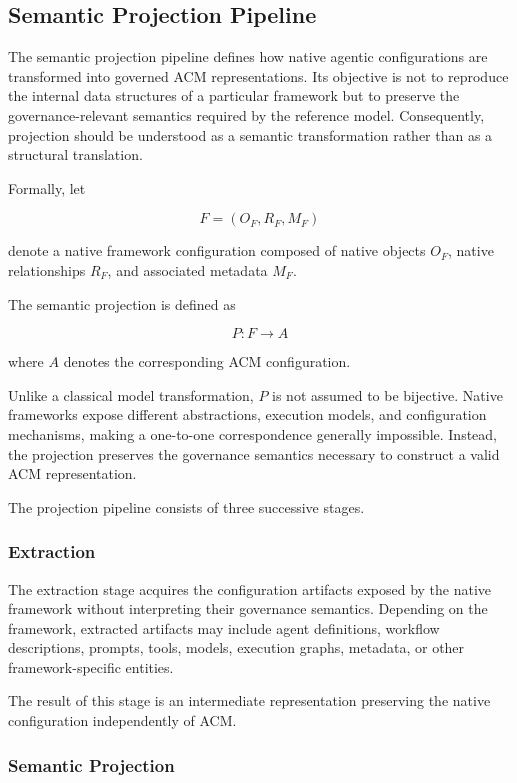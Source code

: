 \documentclass[10pt]{article}
\begin{document}
\subsection{Semantic Projection Pipeline}
\label{sec:semantic_projection}
The semantic projection pipeline defines how native agentic configurations are transformed into governed ACM representations. Its objective is not to reproduce the internal data structures of a particular framework but to preserve the governance-relevant semantics required by the reference model. Consequently, projection should be understood as a semantic transformation rather than as a structural translation.

Formally, let

\[
F=(O_F,R_F,M_F)
\]

denote a native framework configuration composed of native objects \(O_F\), native relationships \(R_F\), and associated metadata \(M_F\).

The semantic projection is defined as

\[
P:F\rightarrow A
\]

where \(A\) denotes the corresponding ACM configuration.

Unlike a classical model transformation, \(P\) is not assumed to be bijective. Native frameworks expose different abstractions, execution models, and configuration mechanisms, making a one-to-one correspondence generally impossible. Instead, the projection preserves the governance semantics necessary to construct a valid ACM representation.

The projection pipeline consists of three successive stages.

\subsubsection{Extraction}

The extraction stage acquires the configuration artifacts exposed by the native framework without interpreting their governance semantics. Depending on the framework, extracted artifacts may include agent definitions, workflow descriptions, prompts, tools, models, execution graphs, metadata, or other framework-specific entities.

The result of this stage is an intermediate representation preserving the native configuration independently of ACM.

\subsubsection{Semantic Projection}
\end{document}
